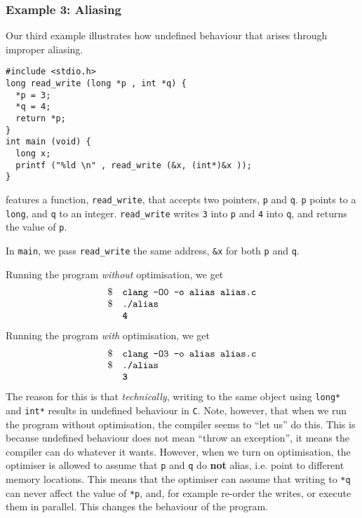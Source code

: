 \subsubsection{Example 3: Aliasing}
Our third example illustrates how undefined behaviour that arises through improper aliasing. 

\begin{code}
\label{code:optimisation-al-overflow}
\begin{verbatim}
#include <stdio.h>
long read_write (long *p , int *q) {
  *p = 3;
  *q = 4;
  return *p;
}
int main (void) {
  long x;
  printf ("%ld \n" , read_write (&x, (int*)&x ));
}
\end{verbatim}
\end{code}

 features a function, \texttt{read\_write}, that accepts two pointers, \texttt{p} and \texttt{q}. \texttt{p} points to a \texttt{long}, and \texttt{q} to an integer. \texttt{read\_write} writes \texttt{3} into \texttt{p} and \texttt{4} into \texttt{q}, and returns the value of \texttt{p}.

In \texttt{main}, we pass \texttt{read\_write} the same address, \texttt{\&x} for both \texttt{p} and \texttt{q}. 

Running the program \textit{without} optimisation, we get
\[\begin{array}{ll}
    \$ & \texttt{clang -O0 -o alias alias.c} \\
    \$ & \texttt{./alias} \\
       & \texttt{\textbf{4}}
\end{array}\]
Running the program \textit{with} optimisation, we get
\[\begin{array}{ll}
    \$ & \texttt{clang -O3 -o alias alias.c} \\
    \$ & \texttt{./alias} \\
       & \texttt{\textbf{3}}
\end{array}\]
The reason for this is that \textit{technically}, writing to the same object using \texttt{long*} and \texttt{int*} results in undefined behaviour in \texttt{C}. Note, however, that when we run the program without optimisation, the compiler seems to ``let us'' do this. This is because undefined behaviour does not mean ``throw an exception'', it means the compiler can do whatever it wants. However, when we turn on optimisation, the optimiser is allowed to assume that \texttt{p} and \texttt{q} do \textbf{not} alias, i.e. point to different memory locations. This means that the optimiser can assume that writing to \texttt{*q} can never affect the value of \texttt{*p}, and, for example re-order the writes, or execute them in parallel. This changes the behaviour of the program. 

